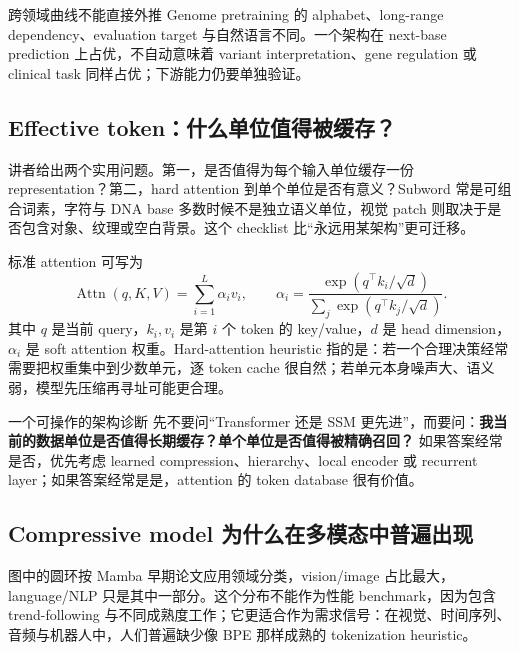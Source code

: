 
\begin{warningbox}{跨领域曲线不能直接外推}
Genome pretraining 的 alphabet、long-range dependency、evaluation target 与自然语言不同。一个架构在 next-base prediction 上占优，不自动意味着 variant interpretation、gene regulation 或 clinical task 同样占优；下游能力仍要单独验证。
\end{warningbox}

\subsection{Effective token：什么单位值得被缓存？}

讲者给出两个实用问题。第一，是否值得为每个输入单位缓存一份 representation？第二，hard attention 到单个单位是否有意义？Subword 常是可组合词素，字符与 DNA base 多数时候不是独立语义单位，视觉 patch 则取决于是否包含对象、纹理或空白背景。这个 checklist 比“永远用某架构”更可迁移。


标准 attention 可写为
\[
\operatorname{Attn}(q,K,V)
=\sum_{i=1}^{L}\alpha_i v_i,
\qquad
\alpha_i=\frac{\exp(q^\top k_i/\sqrt d)}{\sum_j\exp(q^\top k_j/\sqrt d)}.
\]
其中 $q$ 是当前 query，$k_i,v_i$ 是第 $i$ 个 token 的 key/value，$d$ 是 head dimension，$\alpha_i$ 是 soft attention 权重。Hard-attention heuristic 指的是：若一个合理决策经常需要把权重集中到少数单元，逐 token cache 很自然；若单元本身噪声大、语义弱，模型先压缩再寻址可能更合理。

\begin{importantbox}{一个可操作的架构诊断}
先不要问“Transformer 还是 SSM 更先进”，而要问：\textbf{我当前的数据单位是否值得长期缓存？单个单位是否值得被精确召回？} 如果答案经常是否，优先考虑 learned compression、hierarchy、local encoder 或 recurrent layer；如果答案经常是是，attention 的 token database 很有价值。
\end{importantbox}

\subsection{Compressive model 为什么在多模态中普遍出现}

图中的圆环按 Mamba 早期论文应用领域分类，vision/image 占比最大，language/NLP 只是其中一部分。这个分布不能作为性能 benchmark，因为包含 trend-following 与不同成熟度工作；它更适合作为需求信号：在视觉、时间序列、音频与机器人中，人们普遍缺少像 BPE 那样成熟的 tokenization heuristic。


